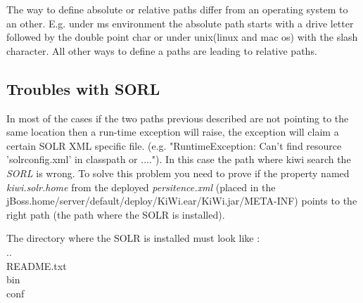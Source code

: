 \documentclass{article}
\begin{document}
The way to define absolute or relative paths differ from an operating system to an other. E.g. under ms environment the absolute path starts with a drive letter followed by the double point char or under unix(linux and mac os) with the slash character. All other ways to define a paths are leading to relative paths.

\subsection{Troubles with SORL}

In most of the cases if the two paths previous described are not pointing to the same location then a run-time exception will raise, the exception will claim a certain SOLR XML specific file. 
(e.g. "RuntimeException: Can't find resource 'solrconfig.xml' in classpath or ....").
 In this case the path where kiwi search the \textit{SORL} is wrong. To solve this problem you need to prove if the property named \textit{kiwi.solr.home} from the deployed \textit{persitence.xml} (placed in the jBoss.home/server/default/deploy/KiWi.ear/KiWi.jar/META-INF) points to the right path (the path where the SOLR is installed). 
 
 The directory where the SOLR is installed must look like :\\
 ..\\
  README.txt\\
  bin\\
  conf\\
\end{document}

